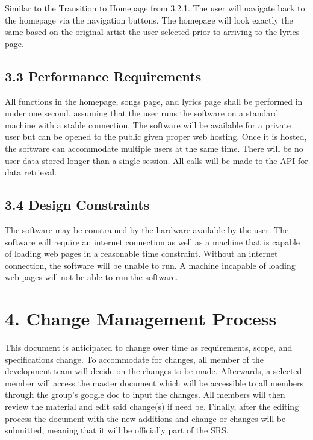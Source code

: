 \documentclass[]{article}
\begin{document}
Similar to the Transition to Homepage from 3.2.1. The user will navigate
back to the homepage via the navigation buttons. The homepage will look
exactly the same based on the original artist the user selected prior to
arriving to the lyrics page.

\subsection{3.3 Performance
Requirements}\label{performance-requirements}

All functions in the homepage, songs page, and lyrics page shall be
performed in under one second, assuming that the user runs the software
on a standard machine with a stable connection. The software will be
available for a private user but can be opened to the public given
proper web hosting. Once it is hosted, the software can accommodate
multiple users at the same time. There will be no user data stored
longer than a single session. All calls will be made to the API for data
retrieval.

\subsection{3.4 Design Constraints}\label{design-constraints}

The software may be constrained by the hardware available by the user.
The software will require an internet connection as well as a machine
that is capable of loading web pages in a reasonable time constraint.
Without an internet connection, the software will be unable to run. A
machine incapable of loading web pages will not be able to run the
software.

\section{4. Change Management Process}\label{change-management-process}

This document is anticipated to change over time as requirements, scope,
and specifications change. To accommodate for changes, all member of the
development team will decide on the changes to be made. Afterwards, a
selected member will access the master document which will be accessible
to all members through the group's google doc to input the changes. All
members will then review the material and edit said change(s) if need
be. Finally, after the editing process the document with the new
additions and change or changes will be submitted, meaning that it will
be officially part of the SRS.
\end{document}
